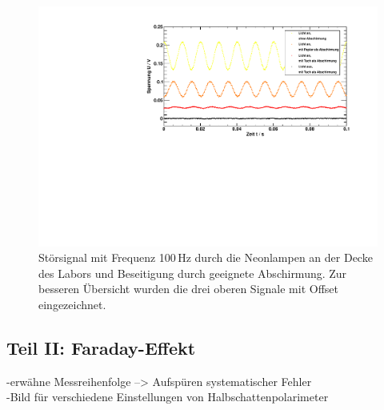 \begin{figure}[H]
\begin{center}
  \includegraphics[width=\textwidth]{../img/licht.pdf}
  \caption{Störsignal mit Frequenz 100\,Hz durch die Neonlampen an der Decke des Labors und
  Beseitigung durch geeignete Abschirmung.
  Zur besseren Übersicht wurden die drei oberen Signale mit Offset eingezeichnet. }
  \label{img:licht}
\end{center}
\end{figure}


\subsection{Teil II: Faraday-Effekt}
-erwähne Messreihenfolge --> Aufspüren systematischer Fehler \\
-Bild für verschiedene Einstellungen von Halbschattenpolarimeter